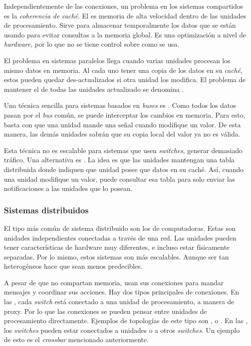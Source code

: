 Independientemente de las conexiones, un problema en los sistemas compartidos
es la \emph{coherencia de caché}. El  es memoria de alta velocidad
dentro de las unidades de procesamiento. Sirve para almacenar temporalmente los
datos que se están usando para evitar consultas a la memoria global. Es una
optimización a nivel de \emph{hardware}, por lo que no se tiene control sobre
como se usa.

El problema en sistemas paralelos llega cuando varias unidades procesan los
mismo datos en memoria. Al cada uno tener una copia de los datos en su
\emph{caché}, estos pueden quedar des-actualizados si otra unidad los modifica.
El problema de mantener el  de todas las unidades actualizado se
denomina .

Una técnica sencilla para sistemas basados en \emph{buses} es .
Como todos los datos pasan por el \emph{bus} común, se puede interceptar los
cambios en memoria. Para esto, basta con que una unidad mande una señal cuando
modifique un valor. De esta manera, las demás unidades sabrán que su copia
local del valor ya no es válida.

Esta técnica no es escalable para sistemas que usen \emph{switches}, generar
demasiado tráfico. Una alternativa es . La
idea es que las unidades mantengan una tabla distribuida donde indiquen que
unidad posee que datos en su caché. Así, cuando una unidad modifique un valor,
puede consultar esa tabla para solo enviar las notificaciones a las unidades
que lo posean.

\subsubsection{Sistemas distribuidos}

El tipo más común de sistema distribuido son los  de
computadoras. Estas son unidades independientes conectadas a través de una
red. Las unidades pueden tener características de hardware muy diferentes, e
incluso estar físicamente separadas. Por lo mismo, estos sistemas son más
escalables. Aunque ser tan heterogéneos hace que sean menos predecibles.

A pesar de que no compartan memoria, usan sus conexiones para mandar mensajes
y coordinar sus acciones. Hay dos tipos principales de conexiones. En las
, cada \emph{switch} está conectado a una unidad de
procesamiento, a manera de proxy. Por lo que las conexiones se pueden pensar
entre unidades de procesamiento directamente. Ejemplos de topologías de este
tipo son ,  o . En las , los \emph{switches} pueden estar conectados a unidades o a otros
\emph{switches}. Un ejemplo de esto es el \emph{crossbar} mencionado
anteriormente.

